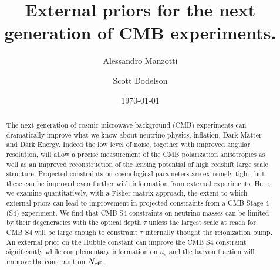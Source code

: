 \documentclass[aps,prd,reprint,superscriptaddress]{revtex4-1}
\begin{document}
\graphicspath{{images/}}

\title{External priors for the next generation of CMB experiments.}

\author{Alessandro Manzotti}
\author{Scott Dodelson}


\date{\today}
\begin{abstract}
The next generation of cosmic microwave background (CMB) experiments can dramatically improve what we know about neutrino physics, inflation, Dark Matter and Dark Energy. 
Indeed the low level of noise, together with improved angular resolution, will allow a precise measurement of the CMB polarization anisotropies as well as an improved reconstruction of the lensing potential of high redshift large scale structure. 
Projected constraints on cosmological parameters are extremely tight, but these can be improved even further with information from external experiments. Here, we examine quantitatively, with a Fisher matrix approach, the extent to which external priors can lead to improvement in projected constraints from a CMB-Stage 4 (S4) experiment.
We find that CMB S4 constraints on neutrino masses can be limited by their degeneracies with the optical depth $\tau$ unless the largest scale at reach for CMB S4 will be large enough to constraint $\tau$ internally thought the reionization bump. An external prior on the Hubble constant can improve the CMB S4 constraint significantly while complementary information on $n_{s}$ and the baryon fraction will improve the constraint on $N_{\rm eff}$.
\end{abstract}

\pacs{}
\maketitle
\end{document}
